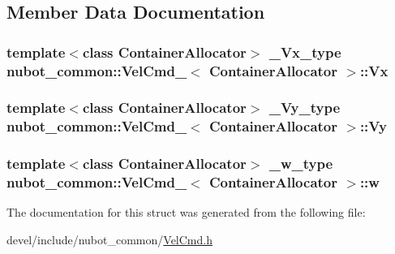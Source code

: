 \subsection{Member Data Documentation}
\hypertarget{structnubot__common_1_1VelCmd___ae26e3779e469d90f39446e82d5470e6f}{
\subsubsection[{Vx}]{\setlength{\rightskip}{0pt plus 5cm}template$<$class Container\-Allocator$>$ {\bf \-\_\-\-Vx\-\_\-type} {\bf nubot\-\_\-common\-::\-Vel\-Cmd\-\_\-}$<$ Container\-Allocator $>$\-::Vx}}\label{structnubot__common_1_1VelCmd___ae26e3779e469d90f39446e82d5470e6f}
\hypertarget{structnubot__common_1_1VelCmd___a3881bc9a781bd9a3bf8074154de0c726}{
\subsubsection[{Vy}]{\setlength{\rightskip}{0pt plus 5cm}template$<$class Container\-Allocator$>$ {\bf \-\_\-\-Vy\-\_\-type} {\bf nubot\-\_\-common\-::\-Vel\-Cmd\-\_\-}$<$ Container\-Allocator $>$\-::Vy}}\label{structnubot__common_1_1VelCmd___a3881bc9a781bd9a3bf8074154de0c726}
\hypertarget{structnubot__common_1_1VelCmd___a99a67eac1b7a33f23c9e70ab8599fd7e}{
\subsubsection[{w}]{\setlength{\rightskip}{0pt plus 5cm}template$<$class Container\-Allocator$>$ {\bf \-\_\-w\-\_\-type} {\bf nubot\-\_\-common\-::\-Vel\-Cmd\-\_\-}$<$ Container\-Allocator $>$\-::w}}\label{structnubot__common_1_1VelCmd___a99a67eac1b7a33f23c9e70ab8599fd7e}


The documentation for this struct was generated from the following file\-:\begin{DoxyCompactItemize}
\item 
devel/include/nubot\-\_\-common/\hyperlink{VelCmd_8h}{Vel\-Cmd.\-h}\end{DoxyCompactItemize}
